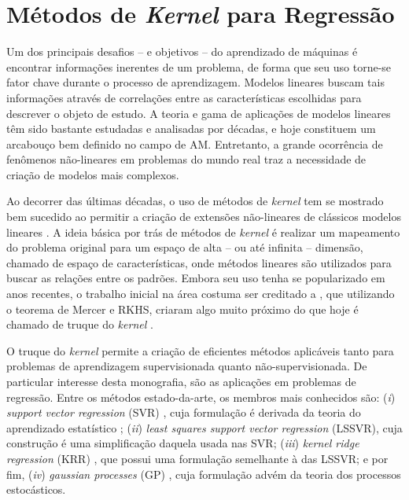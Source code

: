 \chapter{Métodos de \textit{Kernel} para Regressão} \label{chapter:kernel-methods}

Um dos principais desafios -- e objetivos -- do aprendizado de máquinas é encontrar informações inerentes de um problema, de forma que seu uso torne-se fator chave durante o processo de aprendizagem. Modelos lineares buscam tais informações através de correlações entre as características escolhidas para descrever o objeto de estudo. A teoria e gama de aplicações de modelos lineares têm sido bastante estudadas e analisadas por décadas, e hoje constituem um arcabouço bem definido no campo de AM. Entretanto, a grande ocorrência de fenômenos não-lineares em problemas do mundo real traz a necessidade de criação de modelos mais complexos.

Ao decorrer das últimas décadas, o uso de métodos de \textit{kernel} tem se mostrado bem sucedido ao permitir a criação de extensões não-lineares de clássicos modelos lineares \cite{abrahamsen2013}. A ideia básica por trás de métodos de \textit{kernel} é realizar um mapeamento do problema original para um espaço de alta -- ou até infinita -- dimensão, chamado de espaço de características, onde métodos lineares são utilizados para buscar as relações entre os padrões. Embora seu uso tenha se popularizado em anos recentes, o trabalho inicial na área costuma ser creditado a , que utilizando o teorema de Mercer e RKHS, criaram algo muito próximo do que hoje é chamado de truque do \textit{kernel} \cite{schlkopf2004}.

O truque do \textit{kernel} permite a criação de eficientes métodos aplicáveis tanto para problemas de aprendizagem supervisionada quanto não-supervisionada. De particular interesse desta monografia, são as aplicações em problemas de regressão. Entre os métodos estado-da-arte, os membros mais conhecidos são: (\textit{i}) \textit{support vector regression} (SVR) \cite{smola1997}, cuja formulação é derivada da teoria do aprendizado estatístico \cite{vapnik1995,vapnik1998}; (\textit{ii}) \textit{least squares support vector regression} (LSSVR), cuja construção é uma simplificação daquela usada nas SVR; (\textit{iii}) \textit{kernel ridge regression} (KRR) \cite{saunders1998}, que possui uma formulação semelhante à das LSSVR; e por fim, (\textit{iv}) \textit{gaussian processes} (GP) \cite{rasmussen2006}, cuja formulação advém da teoria dos processos estocásticos.

